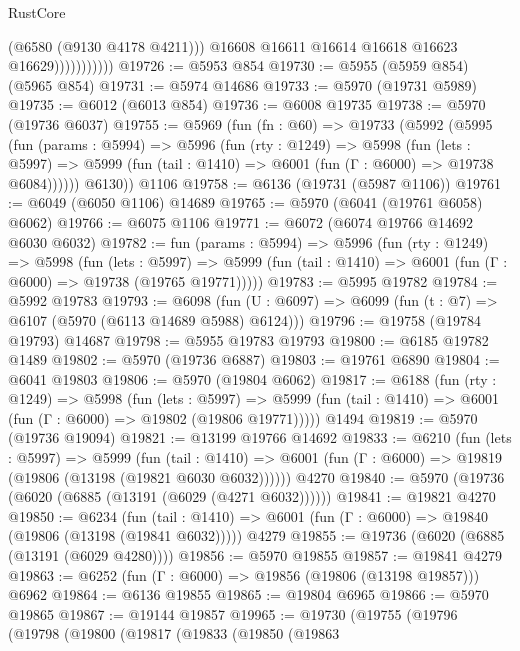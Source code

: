 \begin{lexlean}{RustCore}
\begin{coremodule}
                            (@6580 (@9130 @4178 @4211)))
                          @16608
                          @16611
                          @16614
                          @16618
                          @16623
                          @16629)))))))))))
@19726 := @5953 @854
@19730 := @5955 (@5959 @854) (@5965 @854)
@19731 := @5974 @14686
@19733 := @5970 (@19731 @5989)
@19735 := @6012 (@6013 @854)
@19736 := @6008 @19735
@19738 := @5970 (@19736 @6037)
@19755 := @5969
    (fun (fn : @60) =>
    @19733
      (@5992
        (@5995
          (fun (params : @5994) =>
          @5996
            (fun (rty : @1249) =>
            @5998
              (fun (lets : @5997) =>
              @5999 (fun (tail : @1410) => @6001 (fun (Γ : @6000) => @19738 @6084))))))
        @6130))
    @1106
@19758 := @6136 (@19731 (@5987 @1106))
@19761 := @6049 (@6050 @1106) @14689
@19765 := @5970 (@6041 (@19761 @6058) @6062)
@19766 := @6075 @1106
@19771 := @6072 (@6074 @19766 @14692 @6030 @6032)
@19782 := fun (params : @5994) =>
  @5996
    (fun (rty : @1249) =>
    @5998
      (fun (lets : @5997) =>
      @5999 (fun (tail : @1410) => @6001 (fun (Γ : @6000) => @19738 (@19765 @19771)))))
@19783 := @5995 @19782
@19784 := @5992 @19783
@19793 := @6098
    (fun (U : @6097) => @6099 (fun (t : @7) => @6107 (@5970 (@6113 @14689 @5988) @6124)))
@19796 := @19758 (@19784 @19793) @14687
@19798 := @5955 @19783 @19793
@19800 := @6185 @19782 @1489
@19802 := @5970 (@19736 @6887)
@19803 := @19761 @6890
@19804 := @6041 @19803
@19806 := @5970 (@19804 @6062)
@19817 := @6188
    (fun (rty : @1249) =>
    @5998
      (fun (lets : @5997) =>
      @5999 (fun (tail : @1410) => @6001 (fun (Γ : @6000) => @19802 (@19806 @19771)))))
    @1494
@19819 := @5970 (@19736 @19094)
@19821 := @13199 @19766 @14692
@19833 := @6210
    (fun (lets : @5997) =>
    @5999
      (fun (tail : @1410) =>
      @6001 (fun (Γ : @6000) => @19819 (@19806 (@13198 (@19821 @6030 @6032))))))
    @4270
@19840 := @5970 (@19736 (@6020 (@6885 (@13191 (@6029 (@4271 @6032))))))
@19841 := @19821 @4270
@19850 := @6234
    (fun (tail : @1410) => @6001 (fun (Γ : @6000) => @19840 (@19806 (@13198 (@19841 @6032)))))
    @4279
@19855 := @19736 (@6020 (@6885 (@13191 (@6029 @4280))))
@19856 := @5970 @19855
@19857 := @19841 @4279
@19863 := @6252 (fun (Γ : @6000) => @19856 (@19806 (@13198 @19857))) @6962
@19864 := @6136 @19855
@19865 := @19804 @6965
@19866 := @5970 @19865
@19867 := @19144 @19857
@19965 := @19730
    (@19755
      (@19796
        (@19798
          (@19800
            (@19817
              (@19833
                (@19850
                  (@19863

\end{coremodule}
\end{lexlean}
